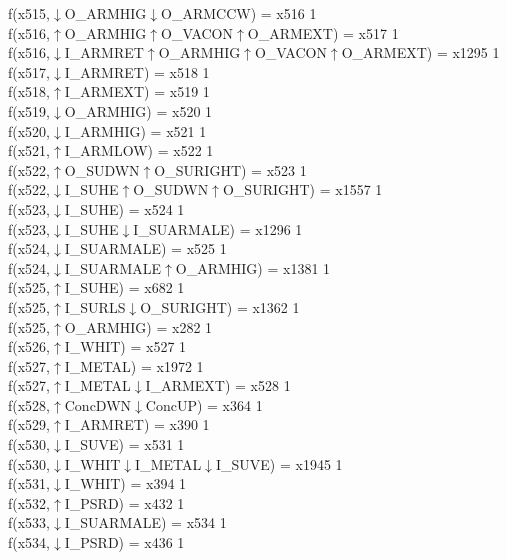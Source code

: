 f(x515,$\downarrow$O\_ARMHIG$\downarrow$O\_ARMCCW) = x516 {1} \\
f(x516,$\uparrow$O\_ARMHIG$\uparrow$O\_VACON$\uparrow$O\_ARMEXT) = x517 {1} \\
f(x516,$\downarrow$I\_ARMRET$\uparrow$O\_ARMHIG$\uparrow$O\_VACON$\uparrow$O\_ARMEXT) = x1295 {1} \\
f(x517,$\downarrow$I\_ARMRET) = x518 {1} \\
f(x518,$\uparrow$I\_ARMEXT) = x519 {1} \\
f(x519,$\downarrow$O\_ARMHIG) = x520 {1} \\
f(x520,$\downarrow$I\_ARMHIG) = x521 {1} \\
f(x521,$\uparrow$I\_ARMLOW) = x522 {1} \\
f(x522,$\uparrow$O\_SUDWN$\uparrow$O\_SURIGHT) = x523 {1} \\
f(x522,$\downarrow$I\_SUHE$\uparrow$O\_SUDWN$\uparrow$O\_SURIGHT) = x1557 {1} \\
f(x523,$\downarrow$I\_SUHE) = x524 {1} \\
f(x523,$\downarrow$I\_SUHE$\downarrow$I\_SUARMALE) = x1296 {1} \\
f(x524,$\downarrow$I\_SUARMALE) = x525 {1} \\
f(x524,$\downarrow$I\_SUARMALE$\uparrow$O\_ARMHIG) = x1381 {1} \\
f(x525,$\uparrow$I\_SUHE) = x682 {1} \\
f(x525,$\uparrow$I\_SURLS$\downarrow$O\_SURIGHT) = x1362 {1} \\
f(x525,$\uparrow$O\_ARMHIG) = x282 {1} \\
f(x526,$\uparrow$I\_WHIT) = x527 {1} \\
f(x527,$\uparrow$I\_METAL) = x1972 {1} \\
f(x527,$\uparrow$I\_METAL$\downarrow$I\_ARMEXT) = x528 {1} \\
f(x528,$\uparrow$ConcDWN$\downarrow$ConcUP) = x364 {1} \\
f(x529,$\uparrow$I\_ARMRET) = x390 {1} \\
f(x530,$\downarrow$I\_SUVE) = x531 {1} \\
f(x530,$\downarrow$I\_WHIT$\downarrow$I\_METAL$\downarrow$I\_SUVE) = x1945 {1} \\
f(x531,$\downarrow$I\_WHIT) = x394 {1} \\
f(x532,$\uparrow$I\_PSRD) = x432 {1} \\
f(x533,$\downarrow$I\_SUARMALE) = x534 {1} \\
f(x534,$\downarrow$I\_PSRD) = x436 {1} \\
